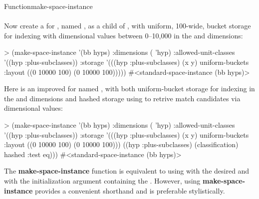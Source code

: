 \documentclass[10pt,twoside,english,pdftex]{article}
\begin{document}
\begin{functiondoc}{Function}{make-space-instance}{
      \\ 
      \\
    \returns{} }
%
Now create a  for  ,
named , as a child of , with uniform, 100-wide, bucket
storage for indexing  with dimensional values between 
0--10,000 in the  and  dimensions:
\begin{example}
> (make-space-instance '(bb hyps)
     :dimensions ( 'hyp)
     :allowed-unit-classes '((hyp :plus-subclasses))
     :storage '(((hyp :plus-subclasses) (x y) 
                 uniform-buckets :layout ((0 10000 100)
                                          (0 10000 100)))))
#<standard-space-instance (bb hyps)>
\end{example}

Here is an improved  for 
 named , with both uniform-bucket storage for
indexing in the  and  dimensions and hashed storage using
 to retrive match candidates via 
dimensional values:
\begin{example}
> (make-space-instance '(bb hyps)
     :dimensions ( 'hyp)
     :allowed-unit-classes '((hyp :plus-subclasses))
     :storage '(((hyp :plus-subclasses) (x y) 
                 uniform-buckets :layout ((0 10000 100)
                                          (0 10000 100)))
                ((hyp :plus-subclasses) (classification) 
                 hashed :test eq)))
#<standard-space-instance (bb hyps)>
\end{example}

\fnnote The \textbf{make-space-instance} function is equivalent to using
\textbf{} with the desired  and
with the initialization argument  containing the
.  However, using \textbf{make-space-instance}
provides a convenient shorthand and is preferable stylistically.

\end{functiondoc}

\end{document}
